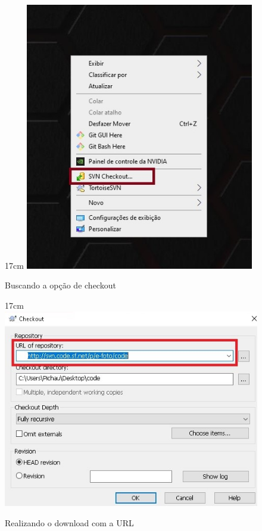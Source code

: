 \begin{figure}[!ht]{17cm}
	\centering
	\includegraphics[width=10cm]{Figuras/checkout.jpg}
	\caption{Buscando a opção de checkout} \label{fig:checkout}
\end{figure}

\begin{figure}[!ht]{17cm}
	\centering
	\includegraphics[width=12cm]{Figuras/url.jpg}
	\caption{Realizando o download com a URL} \label{fig:url}
\end{figure}
 
